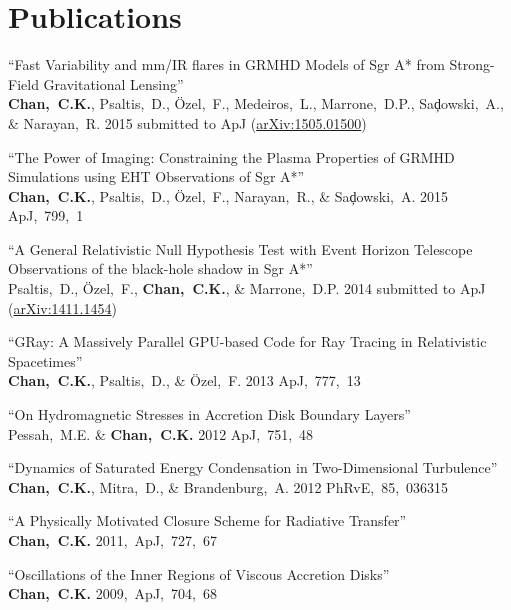 \section*{Publications}

\begin{ilist}

\item ``Fast Variability and mm/IR flares in GRMHD Models of Sgr A* from Strong-Field Gravitational Lensing''\\
  \textbf{Chan,~C.K.}, Psaltis,~D., {\"O}zel,~F., Medeiros,~L., Marrone,~D.P., Sa{\c d}owski,~A., \& Narayan,~R.
  2015 submitted to ApJ (\href{http://arxiv.org/abs/1505.01500}{arXiv:1505.01500})

\item ``The Power of Imaging: Constraining the Plasma Properties of GRMHD Simulations using EHT Observations of Sgr A*''\\
  \textbf{Chan,~C.K.}, Psaltis,~D., {\"O}zel,~F., Narayan,~R., \& Sa{\c d}owski,~A.
  2015 ApJ,~799,~1

\item ``A General Relativistic Null Hypothesis Test with Event Horizon Telescope Observations of the black-hole shadow in Sgr A*''\\
  Psaltis,~D., {\"O}zel,~F., \textbf{Chan,~C.K.}, \& Marrone,~D.P.
  2014 submitted to ApJ (\href{http://arxiv.org/abs/1411.1454}{arXiv:1411.1454})

\item ``GRay: A Massively Parallel GPU-based Code for Ray Tracing in Relativistic Spacetimes''\\
  \textbf{Chan,~C.K.}, Psaltis,~D., \& {\"O}zel,~F.
  2013 ApJ,~777,~13

\item ``On Hydromagnetic Stresses in Accretion Disk Boundary Layers''\\
  Pessah,~M.E. \& \textbf{Chan,~C.K.}
  2012 ApJ,~751,~48

\item ``Dynamics of Saturated Energy Condensation in Two-Dimensional Turbulence''\\
  \textbf{Chan,~C.K.}, Mitra,~D., \& Brandenburg,~A.
  2012 PhRvE,~85,~036315

\item ``A Physically Motivated Closure Scheme for Radiative Transfer''\\
  \textbf{Chan,~C.K.}
  2011,~ApJ,~727,~67

\item ``Oscillations of the Inner Regions of Viscous Accretion Disks''\\
  \textbf{Chan,~C.K.}
  2009,~ApJ,~704,~68


\end{ilist}
